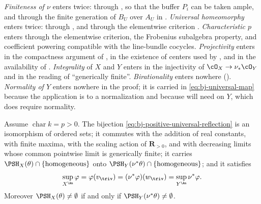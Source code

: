 \begin{remark}
\label{rem:ch43-reflection-hypothesis-map}
\emph{Finiteness of $\nu$} enters twice: through
, so that the buffer $P_i$ can be taken
ample, and through the finite generation of $B_U$ over $A_U$ in
.  \emph{Universal homeomorphy} enters twice:
through , and through the
elementwise criterion .
\emph{Characteristic $p$} enters through the elementwise criterion,
the Frobenius subalgebra property, and coefficient powering compatible
with the line-bundle cocycles.  \emph{Projectivity} enters in the compactness argument of
, in the existence of centers
used by , and in the availability of
.  \emph{Integrality} of $X$ and $Y$ enters in the
injectivity of $\cO_X\to\nu_*\cO_Y$ and in the reading of ``generically
finite''.  \emph{Birationality} enters nowhere
().  \emph{Normality of $Y$}
enters nowhere in the proof; it is carried in
\eqref{eq:bj-universal-map} because the application is to a normalization
and because  will need
 on $Y$, which does require normality.
\end{remark}

\begin{corollary}
\label{cor:ch43-reflection-structure}
Assume $\operatorname{char}k=p>0$.  The bijection
\eqref{eq:bj-positive-universal-reflection} is an isomorphism of ordered
sets; it commutes with the addition of real constants, with finite maxima,
with the scaling action of $\mathbf R_{>0}$, and with decreasing limits
whose common pointwise limit is generically finite;
it carries $\PSH_X(\theta)\cap\{\text{homogeneous}\}$ onto
$\PSH_Y(\nu^*\theta)\cap\{\text{homogeneous}\}$; and it satisfies
\[
 \sup_{X^{\An}}\varphi=\varphi(v_\triv)
 =(\nu^*\varphi)(w_\triv)=\sup_{Y^{\An}}\nu^*\varphi .
\]
Moreover $\PSH_X(\theta)\ne\emptyset$ if and only if
$\PSH_Y(\nu^*\theta)\ne\emptyset$.
\end{corollary}

